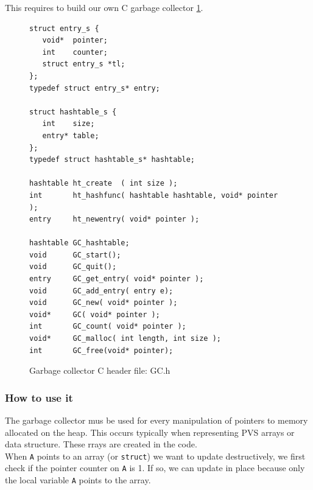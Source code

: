 \documentclass[12pt,a4paper,titlepage]{article}
\newcommand{\cl}[1]{\texttt{#1}}
\begin{document}
This requires to build our own C garbage collector \ref{fig:GC.h}.

\begin{figure}
\begin{lstlisting}
struct entry_s {
   void*  pointer;
   int    counter;
   struct entry_s *tl;
};
typedef struct entry_s* entry;

struct hashtable_s {
   int    size;
   entry* table;	
}; 
typedef struct hashtable_s* hashtable;

hashtable ht_create  ( int size );
int       ht_hashfunc( hashtable hashtable, void* pointer );
entry     ht_newentry( void* pointer );

hashtable GC_hashtable;
void      GC_start();
void      GC_quit();
entry     GC_get_entry( void* pointer );
void      GC_add_entry( entry e);
void      GC_new( void* pointer );
void*     GC( void* pointer );
int       GC_count( void* pointer );
void*     GC_malloc( int length, int size );
int       GC_free(void* pointer);
\end{lstlisting}
\caption{Garbage collector C header file: GC.h}
\label{fig:GC.h}
\end{figure}



\subsubsection{How to use it}

The garbage collector mus be used for every manipulation of pointers to memory allocated on the heap. This occurs typically when representing PVS arrays or data structure. These rrays are created in the code.\\

%


When \cl{A} points to an array (or \cl{struct}) we want to update destructively, we first check if the pointer counter on \cl{A} is 1. If so, we can update in place because only the local variable \cl{A} points to the array.\\
\end{document}

